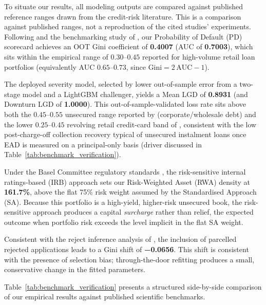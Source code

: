 \documentclass[11pt,a4paper]{article}
\begin{document}
To situate our results, all modeling outputs are compared against published reference ranges drawn from the credit-risk literature. This is a comparison against published ranges, not a reproduction of the cited studies' experiments. Following \textcite{thomas2000survey} and the benchmarking study of \textcite{lessmann2015benchmarking}, our Probability of Default (PD) scorecard achieves an OOT Gini coefficient of \textbf{\num{0.4007}} (AUC of \textbf{\num{0.7003}}), which sits within the empirical range of $0.30$--$0.45$ reported for high-volume retail loan portfolios (equivalently AUC $0.65$--$0.73$, since $\text{Gini} = 2\,\text{AUC}-1$).

The deployed severity model, selected by lower out-of-sample error from a two-stage model and a LightGBM challenger, yields a Mean LGD of \textbf{\num{0.8931}} (and Downturn LGD of \textbf{\num{1.0000}}). This out-of-sample-validated loss rate sits above both the $0.45$--$0.55$ unsecured range reported by \textcite{schuermann2004} (corporate/wholesale debt) and the lower $0.25$--$0.45$ revolving retail credit-card band of \textcite{bellotti2012}, consistent with the low post-charge-off collection recovery typical of unsecured instalment loans once EAD is measured on a principal-only basis (driver discussed in Table~\ref{tab:benchmark_verification}).

Under the Basel Committee regulatory standards \parencite{bcbs2004,bcbs2017}, the risk-sensitive internal ratings-based (IRB) approach sets our Risk-Weighted Asset (RWA) density at \textbf{161.7\%}, above the flat 75\% risk weight assumed by the Standardised Approach (SA). Because this portfolio is a high-yield, higher-risk unsecured book, the risk-sensitive approach produces a capital \emph{surcharge} rather than relief, the expected outcome when portfolio risk exceeds the level implicit in the flat SA weight.

Consistent with the reject inference analysis of \textcite{crook2004reject}, the inclusion of parcelled rejected applications leads to a Gini shift of \textbf{\num{-0.0656}}. This shift is consistent with the presence of selection bias; through-the-door refitting produces a small, conservative change in the fitted parameters.

Table~\ref{tab:benchmark_verification} presents a structured side-by-side comparison of our empirical results against published scientific benchmarks.
\end{document}
